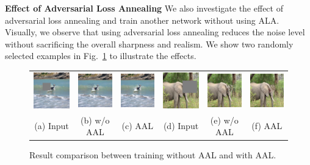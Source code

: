 \noindent\textbf{Effect of Adversarial Loss Annealing} We also investigate the effect of adversarial loss annealing and train another network without using ALA. Visually, we observe that using adversarial loss annealing reduces the noise level without sacrificing the overall sharpness and realism. We show two randomly selected examples in Fig.~\ref{fig:aal} to illustrate the effects. 

\begin{figure}[h!]
\centering
\small
\begin{tabular}{cccccc}
\includegraphics[width=.16\textwidth]{figures/AAL/000000063154_input_image.jpg}&
\includegraphics[width=.16\textwidth]{figures/AAL/000000063154_synthesized_image.jpg}&
\includegraphics[width=.16\textwidth]{figures/AAL/000000063154_synthesized_image-1.jpg}&
\includegraphics[width=.16\textwidth]{figures/AAL/000000475779_input_image.jpg}&
\includegraphics[width=.16\textwidth]{figures/AAL/000000475779_synthesized_image.jpg}&
\includegraphics[width=.16\textwidth]{figures/AAL/000000475779_synthesized_image-1.jpg}\\
(a) Input & (b) w/o AAL & (c) AAL & (d) Input & (e) w/o AAL & (f) AAL \\
\end{tabular}
\caption{Result comparison between training without AAL and with AAL.}
\label{fig:aal}
\vspace{-15pt}
\end{figure}  

